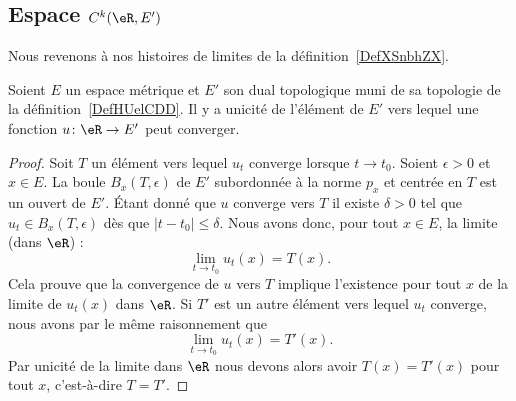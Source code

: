 \subsection{Espace \texorpdfstring{$ C^k(\eR,E')$}{C(R,E')}}

Nous revenons à nos histoires de limites de la définition~\ref{DefXSnbhZX}.
\begin{proposition} \label{PropRBCiHbz}
    Soient \( E\) un espace métrique et \( E'\) son dual topologique muni de sa topologie de la définition~\ref{DefHUelCDD}. Il y a unicité de l'élément de \( E'\) vers lequel une fonction \( u\colon \eR\to E' \) peut converger.
\end{proposition}

\begin{proof}
    Soit \( T\) un élément vers lequel \( u_t\) converge lorsque \( t\to t_0\). Soient \( \epsilon>0\) et \( x\in E\). La boule \( B_x(T,\epsilon)\) de \( E'\) subordonnée à la norme \( p_x\) et centrée en \( T\) est un ouvert de \( E'\). Étant donné que \( u\) converge vers \( T\) il existe \( \delta>0\) tel que \( u_t\in B_x(T,\epsilon)\) dès que \( | t-t_0 |\leq \delta\). Nous avons donc, pour tout \( x\in E\), la limite (dans \( \eR\)) :
    \begin{equation}
        \lim_{t\to t_0} u_t(x)=T(x).
    \end{equation}
    Cela prouve que la convergence de \( u\) vers \( T\) implique l'existence pour tout \( x\) de la limite de \( u_t(x)\) dans \( \eR\). Si \( T'\) est un autre élément vers lequel \( u_t\) converge, nous avons par le même raisonnement que
    \begin{equation}
        \lim_{t\to t_0} u_t(x)=T'(x).
    \end{equation}
    Par unicité de la limite dans \( \eR\)
    nous devons alors avoir \( T(x)=T'(x)\) pour tout \( x\), c'est-à-dire \( T=T'\).
\end{proof}

